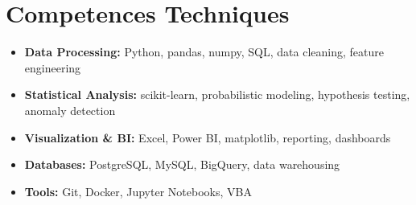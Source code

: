 \documentclass[a4paper,11pt]{article}
\begin{document}
\section{Competences Techniques}
\begin{itemize}[leftmargin=*, nosep]
    \item \small{\textbf{Data Processing:} Python, pandas, numpy, SQL, data cleaning, feature engineering}
    \item \small{\textbf{Statistical Analysis:} scikit-learn, probabilistic modeling, hypothesis testing, anomaly detection}
    \item \small{\textbf{Visualization \& BI:} Excel, Power BI, matplotlib, reporting, dashboards}
    \item \small{\textbf{Databases:} PostgreSQL, MySQL, BigQuery, data warehousing}
    \item \small{\textbf{Tools:} Git, Docker, Jupyter Notebooks, VBA}
\end{itemize}
\end{document}
